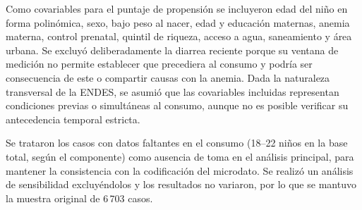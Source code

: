 \documentclass[man,11pt,donotrepeattitle,floatsintext]{apa7}
\begin{document}
Como covariables para el puntaje de propensión se incluyeron edad del niño en forma polinómica, sexo, bajo peso al nacer, edad y educación maternas, anemia materna, control prenatal, quintil de riqueza, acceso a agua, saneamiento y área urbana. Se excluyó deliberadamente la diarrea reciente porque su ventana de medición no permite establecer que precediera al consumo y podría ser consecuencia de este o compartir causas con la anemia. Dada la naturaleza transversal de la ENDES, se asumió que las covariables incluidas representan condiciones previas o simultáneas al consumo, aunque no es posible verificar su antecedencia temporal estricta.

Se trataron los casos con datos faltantes en el consumo (18--22 niños en la base total, según el componente) como ausencia de toma en el análisis principal, para mantener la consistencia con la codificación del microdato. Se realizó un análisis de sensibilidad excluyéndolos y los resultados no variaron, por lo que se mantuvo la muestra original de 6\,703 casos.
\end{document}
